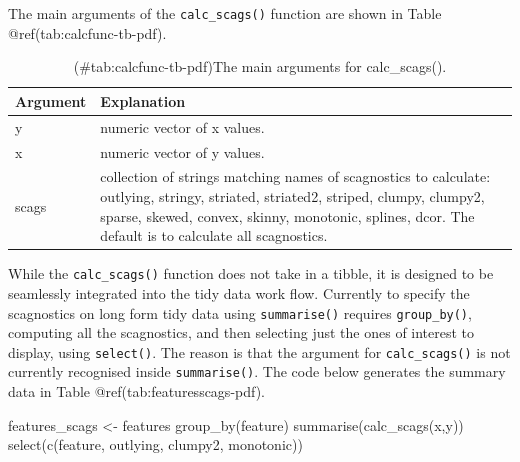 The main arguments of the \texttt{calc\_scags()} function are shown in
Table @ref(tab:calcfunc-tb-pdf).

\begin{Schunk}
\begin{table}

\caption{(\#tab:calcfunc-tb-pdf)The main arguments for calc\_scags().}
\centering
\begin{tabular}[t]{>{\raggedright\arraybackslash}p{3cm}l}
\toprule
Argument & Explanation\\
\midrule
y & numeric vector of x values.\\
x & numeric vector of y values.\\
scags & collection of strings matching names of scagnostics to calculate: outlying, stringy, striated, striated2, striped, clumpy, clumpy2, sparse, skewed, convex, skinny, monotonic, splines, dcor. The default is to calculate all scagnostics.\\
\bottomrule
\end{tabular}
\end{table}

\end{Schunk}

While the \texttt{calc\_scags()} function does not take in a tibble, it
is designed to be seamlessly integrated into the tidy data work flow.
Currently to specify the scagnostics on long form tidy data using
\texttt{summarise()} requires \texttt{group\_by()}, computing all the
scagnostics, and then selecting just the ones of interest to display,
using \texttt{select()}. The reason is that the argument for
\texttt{calc\_scags()} is not currently recognised inside
\texttt{summarise()}. The code below generates the summary data in Table
@ref(tab:featuresscags-pdf).

\begin{Schunk}
\begin{Sinput}
features_scags <- features %
  group_by(feature) %
  summarise(calc_scags(x,y)) %
  select(c(feature, outlying, clumpy2, monotonic))
\end{Sinput}
\end{Schunk}

